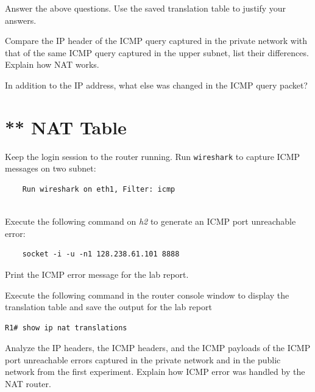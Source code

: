 \documentclass{UTNetLab}
\begin{document}
    \begin{report}
    \item Answer the above questions.
    Use the saved translation table to justify your answers.
    
    \item Compare the IP header of the ICMP query captured in the private network with that of the same ICMP query captured in the upper subnet, list their differences.
    Explain how NAT works.
    
    \item In addition to the IP address, what else was changed in the ICMP query packet?
    \end{report}

\section{** NAT Table}
    Keep the login session to the router running. Run \lstinline{wireshark} to capture ICMP messages on two subnet:
	
    \begin{lstlisting}
    Run wireshark on eth1, Filter: icmp
       
    \end{lstlisting}
	
    Execute the following command on \textit{h2} to generate an ICMP port unreachable error:
    
    \begin{lstlisting}
    socket -i -u -n1 128.238.61.101 8888
    \end{lstlisting}

    Print the ICMP error message for the lab report. 

    Execute the following command in the router console window to display the translation table and save the output for the lab report
    
    \begin{lstlisting}[language=cisco, frame=trBL]
    R1# show ip nat translations
    \end{lstlisting}

    \begin{report}
    \item Analyze the IP headers, the ICMP headers, and the ICMP payloads of the ICMP port unreachable errors captured in the private network and in the public network from the first experiment.
    Explain how ICMP error was handled by the NAT router.
    \end{report}
\end{document}
